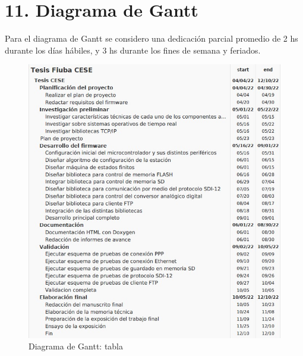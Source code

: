 \documentclass[
11pt, %
]{charter}
\begin{document}
\section{11. Diagrama de Gantt}
\label{sec:gantt}

Para el diagrama de Gantt se considero una dedicación parcial promedio de 2 hs durante los días hábiles, y 3 hs durante los fines de semana y feriados.

\begin{figure}[htpb]
\centering 
\includegraphics[height=.6\textheight]{./Figuras/fechas2.jpg}
\caption{Diagrama de Gantt: tabla}
\label{fig:diagGantt}
\end{figure}
\end{document}
